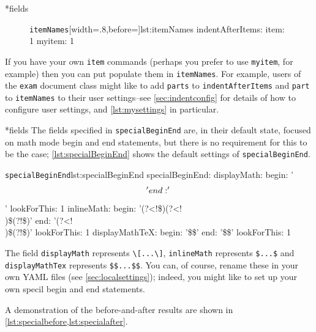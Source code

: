\documentclass[10pt]{article}
\begin{document}
*{fields} 
\begin{figure}
\begin{yaml}{\texttt{itemNames}}[width=.8\linewidth,before=\centering]{lst:itemNames}
indentAfterItems:
    item: 1
    myitem: 1
	\end{yaml}
\end{figure}
If you have your own \texttt{item} commands (perhaps you
prefer to use \texttt{myitem}, for example)
then you can put populate them in \texttt{itemNames}.
For example, users of the \texttt{exam} document class might like to add
\texttt{parts} to \texttt{indentAfterItems} and \texttt{part} to \texttt{itemNames}
to their user settings--see \vref{sec:indentconfig} for details of how to configure user settings,
and \vref{lst:mysettings} in particular.\label{page:examsettings}

*{fields}
The fields specified in \texttt{specialBeginEnd} are, in their default state, focused on math mode begin and end statements, but 
there is no requirement for this to be the case; \cref{lst:specialBeginEnd} shows the 
default settings of \texttt{specialBeginEnd}.
\begin{yaml}{\texttt{specialBeginEnd}}{lst:specialBeginEnd}
specialBeginEnd:
    displayMath:
        begin: '\\\['
        end: '\\\]'
        lookForThis: 1
    inlineMath:
        begin: '(?<!\$)(?<!\\)\$(?!\$)'
        end: '(?<!\\)\$(?!\$)'
        lookForThis: 1
    displayMathTeX:
        begin: '\$\$'
        end: '\$\$'
        lookForThis: 1
	\end{yaml}

    The field \texttt{displayMath} represents \lstinline!\[...\]!, \texttt{inlineMath} represents
    \lstinline!$...$! and \texttt{displayMathTex} represents \lstinline!$$...$$!. You can, of course, 
    rename these in your own YAML files (see \vref{sec:localsettings}); indeed, you 
    might like to set up your own specil begin and end statements.

    A demonstration of the before-and-after results are shown in \cref{lst:specialbefore,lst:specialafter}.

\begin{minipage}{.45\textwidth}
\end{minipage}%
\hfill
\begin{minipage}{.45\textwidth}
\end{minipage}
\end{document}
